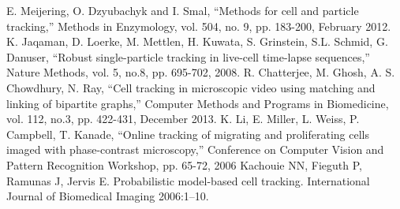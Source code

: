 \documentclass[conference]{IEEEtran}
\begin{document}
\begin{thebibliography}{00}
 E. Meijering, O. Dzyubachyk and I. Smal, ``Methods for cell and particle tracking,'' Methods in Enzymology, vol. 504, no. 9, pp. 183-200, February 2012.
K. Jaqaman, D. Loerke, M. Mettlen, H. Kuwata, S. Grinstein, S.L. Schmid, G. Danuser, ``Robust single-particle tracking in live-cell time-lapse sequences,'' Nature Methods, vol. 5, no.8, pp. 695-702, 2008.
R. Chatterjee, M. Ghosh, A. S. Chowdhury, N. Ray, ``Cell tracking in microscopic video using matching and linking of bipartite graphs,'' Computer Methods and Programs in Biomedicine, vol. 112, no.3, pp. 422-431, December 2013. 
K. Li, E. Miller, L. Weiss, P. Campbell, T. Kanade, ``Online tracking of migrating and proliferating cells imaged with phase-contrast microscopy,'' Conference on Computer Vision and Pattern Recognition Workshop, pp. 65-72, 2006
Kachouie NN, Fieguth P, Ramunas J, Jervis E. Probabilistic model-based cell tracking. International Journal of Biomedical Imaging 2006:1–10.%



\end{thebibliography}
\end{document}

